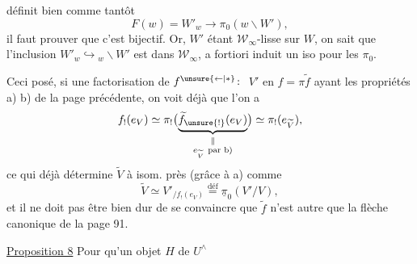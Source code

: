 
définit bien comme tantôt
\[
 F(w)=W'_w\longrightarrow\pi_0(w\backslash W'),
\]
il faut prouver que c'est bijectif. Or, $W'$ étant
 $\mathcal W_\infty$-lisse sur $W$, on sait que l'inclusion
$W'_w\hookrightarrow{}_{w}\backslash W'$ est dans $\mathcal W_\infty$, a fortiori
induit un iso pour les $\pi_0$.

Ceci posé, si  une factorisation de $f^{\unsure{\leftarrow|*}}\colon$ $V'$
en $f=\pi\widetilde f$ ayant les propriétés a) b) de
la page précédente, on voit déjà que l'on a
\[
 f_!(e_V)\simeq\pi_!\bigl(\underbrace{\widetilde f_{\unsure{!}}(e_V)}_{\substack{\Vert\\e_{\widetilde V}\ \text{par b)}}}\bigr)\simeq\pi_!(e_{\widetilde V}),
\]
ce qui déjà détermine $\widetilde V$ à isom. 
près (grâce à a) comme
\[
 \widetilde V\simeq V'_{/f_!(e_V)}\overset{\text{déf}}{=}\underline{\pi}_0(V'/V),
\]
et il ne doit pas être bien dur de se
convaincre que $\widetilde f$ n'est autre que la 
flèche canonique de la page 91.

\uline{Proposition 8} Pour qu'un objet $H$ de $U^\wedge$


